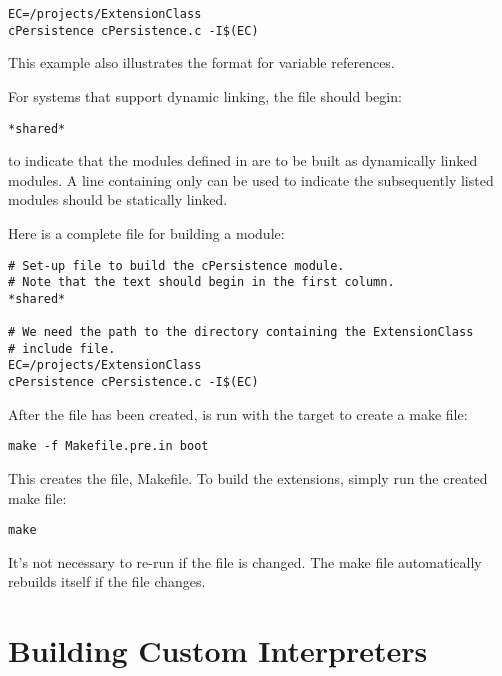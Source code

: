 \documentclass{manual}
\begin{document}
\begin{verbatim}
EC=/projects/ExtensionClass
cPersistence cPersistence.c -I$(EC)
\end{verbatim} %

This example also illustrates the format for variable references.

For systems that support dynamic linking, the  file should 
begin:

\begin{verbatim}
*shared*
\end{verbatim}

to indicate that the modules defined in  are to be built
as dynamically linked modules.  A line containing only 
can be used to indicate the subsequently listed modules should be
statically linked.

Here is a complete  file for building a
 module:

\begin{verbatim}
# Set-up file to build the cPersistence module. 
# Note that the text should begin in the first column.
*shared*

# We need the path to the directory containing the ExtensionClass
# include file.
EC=/projects/ExtensionClass
cPersistence cPersistence.c -I$(EC)
\end{verbatim} %

After the  file has been created, 
is run with the  target to create a make file:

\begin{verbatim}
make -f Makefile.pre.in boot
\end{verbatim}

This creates the file, Makefile.  To build the extensions, simply
run the created make file:

\begin{verbatim}
make
\end{verbatim}

It's not necessary to re-run  if the
 file is changed.  The make file automatically rebuilds
itself if the  file changes.


\section{Building Custom Interpreters \label{custom-interps}}
\end{document}
